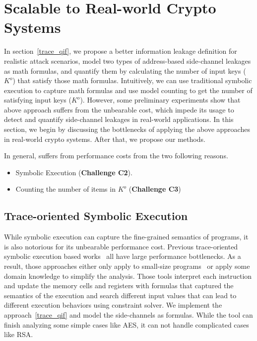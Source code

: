 \section{Scalable to Real-world Crypto Systems}

In section~\ref{trace_qif}, we propose a better information leakage definition
for realistic attack scenarios, model two types of address-based side-channel
leakages
as math formulas, and quantify them by calculating the number of input
keys ($K^o$) that satisfy those math formulas. Intuitively, we can use
traditional symbolic execution to capture math formulas and use model
counting to get the number of satisfying input keys ($K^o$).
However, some preliminary experiments show that above approach suffers from the unbearable cost, 
which impede its usage
to detect and quantify side-channel leakages in real-world applications. 
In this section, we begin by discussing the bottlenecks of applying the 
above approaches in real-world crypto systems. After that, we propose
our methods.

In general, \tool{} suffers from performance costs
from the two following reasons. 
\begin{itemize}
    \item Symbolic Execution (\textbf{Challenge C2}).
    \item Counting the number of items in $K^o$ (\textbf{Challenge C3})
\end{itemize}

\subsection{Trace-oriented Symbolic Execution}
While symbolic execution can capture the fine-grained semantics of programs,
it is also notorious for its unbearable performance cost. Previous 
trace-oriented symbolic execution based
works~\cite{203878,Chattopadhyay:2017:QIL:3127041.3127044} all 
have large performance bottlenecks. As a result, those approaches 
either only apply to small-size programs~\cite{Chattopadhyay:2017:QIL:3127041.3127044} 
or apply some domain knowledge to simplify the analysis.
Those tools interpret each instruction and update the memory cells and registers with
formulas that captured the semantics of the execution and search different 
input values that can lead to different execution behaviors using constraint solver.
We implement the approach~\ref{trace_qif} and model the side-channels as formulas.
While the tool can finish analyzing some simple cases like AES, 
it can not handle complicated cases like RSA. 

